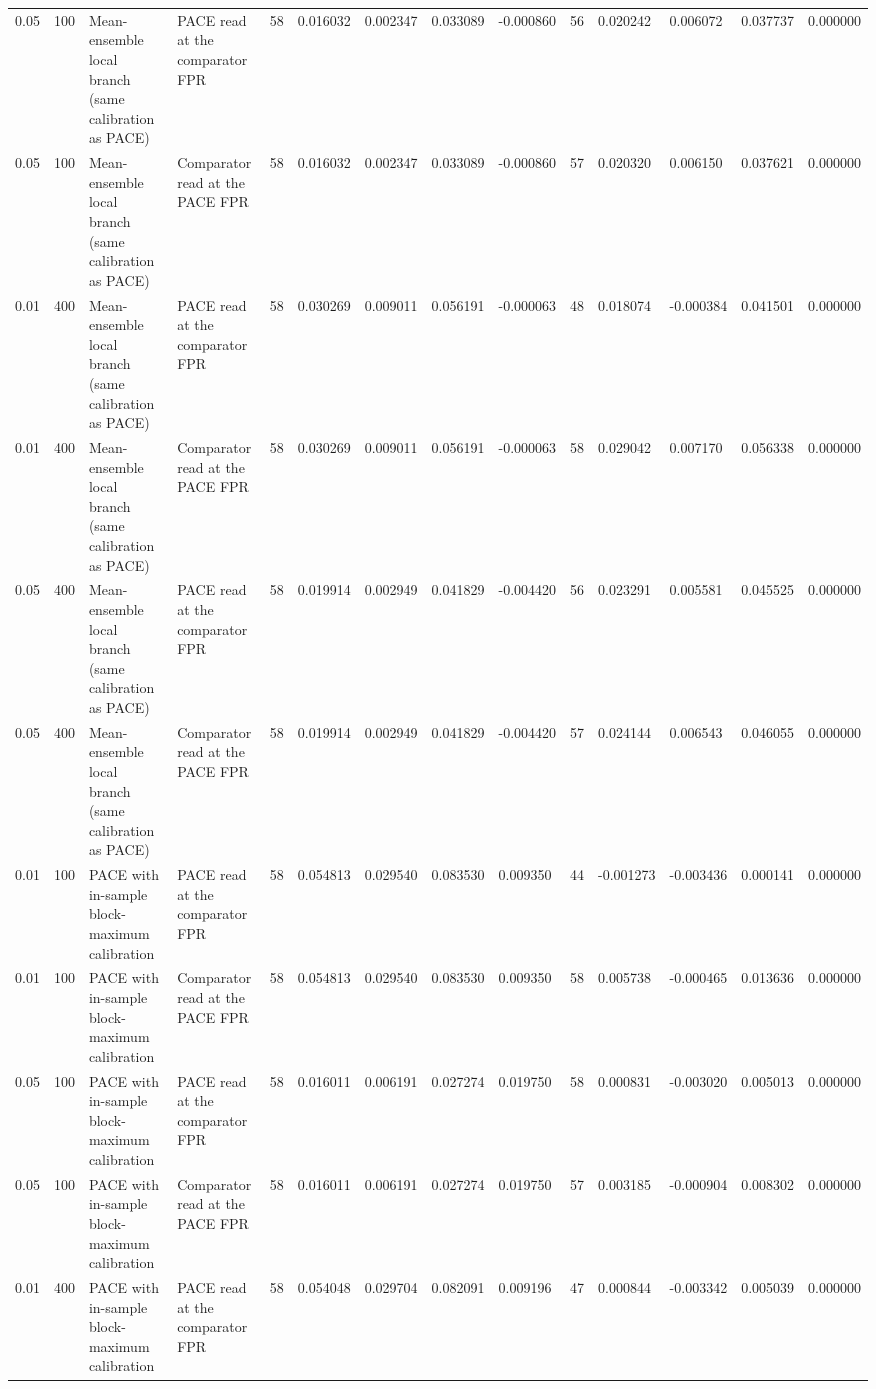 \begin{tabular}{llllllllllllll}
0.05 & 100 & Mean-ensemble local branch (same calibration as PACE) & PACE read at the comparator FPR & 58 & 0.016032 & 0.002347 & 0.033089 & -0.000860 & 56 & 0.020242 & 0.006072 & 0.037737 & 0.000000 \\
0.05 & 100 & Mean-ensemble local branch (same calibration as PACE) & Comparator read at the PACE FPR & 58 & 0.016032 & 0.002347 & 0.033089 & -0.000860 & 57 & 0.020320 & 0.006150 & 0.037621 & 0.000000 \\
0.01 & 400 & Mean-ensemble local branch (same calibration as PACE) & PACE read at the comparator FPR & 58 & 0.030269 & 0.009011 & 0.056191 & -0.000063 & 48 & 0.018074 & -0.000384 & 0.041501 & 0.000000 \\
0.01 & 400 & Mean-ensemble local branch (same calibration as PACE) & Comparator read at the PACE FPR & 58 & 0.030269 & 0.009011 & 0.056191 & -0.000063 & 58 & 0.029042 & 0.007170 & 0.056338 & 0.000000 \\
0.05 & 400 & Mean-ensemble local branch (same calibration as PACE) & PACE read at the comparator FPR & 58 & 0.019914 & 0.002949 & 0.041829 & -0.004420 & 56 & 0.023291 & 0.005581 & 0.045525 & 0.000000 \\
0.05 & 400 & Mean-ensemble local branch (same calibration as PACE) & Comparator read at the PACE FPR & 58 & 0.019914 & 0.002949 & 0.041829 & -0.004420 & 57 & 0.024144 & 0.006543 & 0.046055 & 0.000000 \\
0.01 & 100 & PACE with in-sample block-maximum calibration & PACE read at the comparator FPR & 58 & 0.054813 & 0.029540 & 0.083530 & 0.009350 & 44 & -0.001273 & -0.003436 & 0.000141 & 0.000000 \\
0.01 & 100 & PACE with in-sample block-maximum calibration & Comparator read at the PACE FPR & 58 & 0.054813 & 0.029540 & 0.083530 & 0.009350 & 58 & 0.005738 & -0.000465 & 0.013636 & 0.000000 \\
0.05 & 100 & PACE with in-sample block-maximum calibration & PACE read at the comparator FPR & 58 & 0.016011 & 0.006191 & 0.027274 & 0.019750 & 58 & 0.000831 & -0.003020 & 0.005013 & 0.000000 \\
0.05 & 100 & PACE with in-sample block-maximum calibration & Comparator read at the PACE FPR & 58 & 0.016011 & 0.006191 & 0.027274 & 0.019750 & 57 & 0.003185 & -0.000904 & 0.008302 & 0.000000 \\
0.01 & 400 & PACE with in-sample block-maximum calibration & PACE read at the comparator FPR & 58 & 0.054048 & 0.029704 & 0.082091 & 0.009196 & 47 & 0.000844 & -0.003342 & 0.005039 & 0.000000 \\

\end{tabular}

